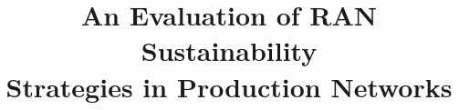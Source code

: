 \documentclass[10pt, conference, letterpaper]{IEEEtran}
\begin{document}
\title{An Evaluation of RAN Sustainability\\Strategies in Production Networks \vspace*{-8pt}}

\end{document}
